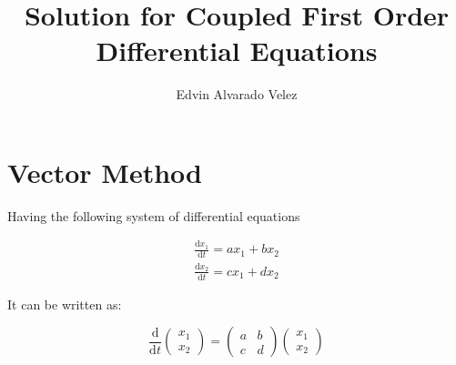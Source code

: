 \documentclass[12pt,letterpaper]{article}
\author{Edvin Alvarado Velez}
\title{Solution for Coupled First Order Differential Equations}
\newcommand{\vectors}[2]{
	\begin{pmatrix}
		#1 \\ #2
	\end{pmatrix}
}
\newcommand{\smatrix}[4]{
	\begin{pmatrix}
		#1 & #2 \\ #3 & #4
	\end{pmatrix}
}
\begin{document}
	
		
		
		
		

	\maketitle
	
	\clearpage
		

	\section{Vector Method}

		Having the following system of differential equations

		\begin{align*}
			\frac{\mathrm{d}x_1}{\mathrm{d}t} = a x_1 + b x_2 \\
			\frac{\mathrm{d}x_2}{\mathrm{d}t} = c x_1 + d x_2 
		\end{align*}

		It can be written as:

		\begin{equation}
			\frac{\mathrm{d}}{\mathrm{d}t} \vectors{x_1}{x_2} = \smatrix{a}{b}{c}{d} \vectors{x_1}{x_2}
		\end{equation}
		\label{og}
\end{document}
